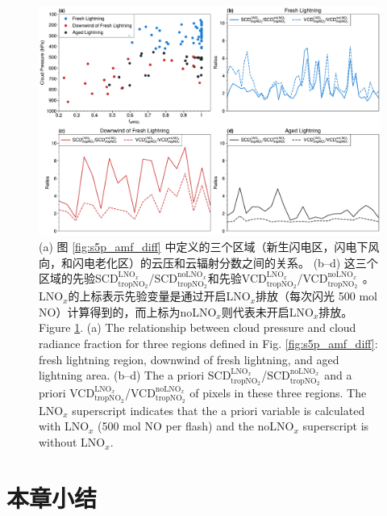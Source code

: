 \begin{figure}[!htbp]
    \centering
    \includegraphics[width=14cm]{./figures/amf_contribution.pdf}
    \caption{
    (a) 图 \ref{fig:s5p_amf_diff} 中定义的三个区域（新生闪电区，闪电下风向，和闪电老化区）的云压和云辐射分数之间的关系。
     (b--d) 这三个区域的先验SCD$^{\textrm{LNO$_x$}}_{\textrm{tropNO$_2$}}$/SCD$^{\textrm{noLNO$_x$}}_{ \textrm{tropNO$_2$}}$和先验VCD$^{\textrm{LNO$_x$}}_{\textrm{tropNO$_2$}}$/VCD$^{\textrm{noLNO$_x$ }}_{\textrm{tropNO$_2$}}$。
     LNO$_x$的上标表示先验变量是通过开启LNO$_x$排放（每次闪光 500 mol NO）计算得到的，而上标为noLNO$_x$则代表未开启LNO$_x$排放。\\
     Figure \ref{fig:amf_contribution}. (a) The relationship between cloud pressure and cloud radiance fraction for three regions defined in Fig. \ref{fig:s5p_amf_diff}: fresh lightning region, downwind of fresh lightning, and aged lightning area.
    (b--d) The a priori SCD$^{\textrm{LNO$_x$}}_{\textrm{tropNO$_2$}}$/SCD$^{\textrm{noLNO$_x$}}_{\textrm{tropNO$_2$}}$ and a priori VCD$^{\textrm{LNO$_x$}}_{\textrm{tropNO$_2$}}$/VCD$^{\textrm{noLNO$_x$}}_{\textrm{tropNO$_2$}}$ of pixels in these three regions. The LNO$_x$ superscript indicates that the a priori variable is calculated with LNO$_x$ (500 mol NO per flash) and the noLNO$_x$ superscript is without LNO$_x$.
    }
    \label{fig:amf_contribution}
\end{figure}


\section{本章小结}
